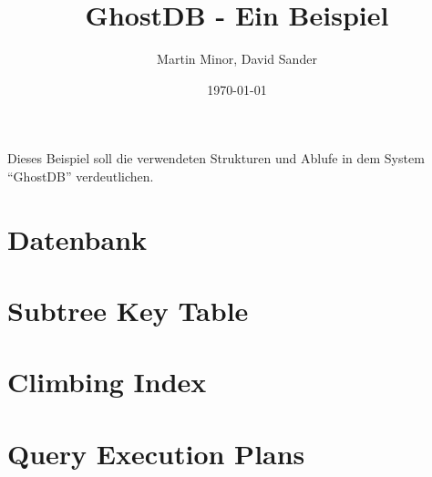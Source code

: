 \documentclass[a4paper, pdftex, notitlepage, parskip]{scrreprt}
\begin{document}
\title{\vspace{2cm} \Huge GhostDB - Ein Beispiel \vspace{2cm}}
\author{Martin Minor, David Sander}
\date{\today}
\maketitle
\vspace{2cm}
%
Dieses Beispiel soll die verwendeten Strukturen und Ablufe in dem System ``GhostDB'' verdeutlichen.
%
\tableofcontents
\listoffigures
\listoftables
\pagestyle{headings}
%

\chapter{Datenbank}

\chapter{Subtree Key Table}

\chapter{Climbing Index}

\chapter{Query Execution Plans}\label{chp:Query Execution Plans}

%
\end{document}

